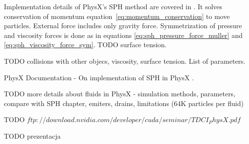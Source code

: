 Implementation details of PhysX's SPH method are covered in \cite{Harris08}. It solves conservation of momentum equation~\ref{eq:momentum_conservation} to move particles. External force includes only gravity force. Symmetrization of pressure and viscosity forces is done as in equations \ref{eq:sph_pressure_force_muller} and \ref{eq:sph_viscosity_force_sym}. TODO surface tension.

TODO collisions with other objecs, viscosity, surface tension. List of parameters.

PhysX Documentation - \cite{PhysXDoc}
On implementation of SPH in PhysX \cite{Harris08}.

TODO more details about fluids in PhysX - simulation methods, parameters, compare with SPH chapter, emiters, drains, limitations (64K particles per fluid)

TODO $ftp://download.nvidia.com/developer/cuda/seminar/TDCI_PhysX.pdf$

TODO prezentacja



